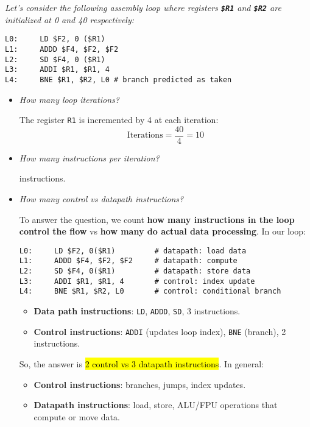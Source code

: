 \emph{Let's consider the following assembly loop where registers \textbf{\texttt{\$R1}} and \textbf{\texttt{\$R2}} are initialized at 0 and 40 respectively:}
\begin{lstlisting}[mathescape=false]
L0:     LD $F2, 0 ($R1)
L1:     ADDD $F4, $F2, $F2
L2:     SD $F4, 0 ($R1)
L3:     ADDI $R1, $R1, 4
L4:     BNE $R1, $R2, L0 # branch predicted as taken
\end{lstlisting}
\begin{itemize}
    \item \emph{How many loop iterations?}

    \answer The register \texttt{R1} is incremented by 4 at each iteration:
    \begin{equation*}
        \text{Iterations} = \dfrac{40}{4} = 10
    \end{equation*}


    \item \emph{How many instructions per iteration?}

     instructions.


    \item \emph{How many control vs datapath instructions?}

    \answer To answer the question, we count \textbf{how many instructions in the loop control the flow} vs \textbf{how many do actual data processing}. In our loop:
    \begin{lstlisting}[language=unknown]
L0:     LD $F2, 0($R1)         # datapath: load data
L1:     ADDD $F4, $F2, $F2     # datapath: compute
L2:     SD $F4, 0($R1)         # datapath: store data
L3:     ADDI $R1, $R1, 4       # control: index update
L4:     BNE $R1, $R2, L0       # control: conditional branch\end{lstlisting}
    \begin{itemize}
        \item \textbf{Data path instructions}: \texttt{LD}, \texttt{ADDD}, \texttt{SD}, 3 instructions.
        \item \textbf{Control instructions}: \texttt{ADDI} (updates loop index), \texttt{BNE} (branch), 2 instructions.
    \end{itemize}
    So, the answer is \hl{2 control vs 3 datapath instructions}. In general:
    \begin{itemize}
        \item \textbf{Control instructions}: branches, jumps, index updates.
        \item \textbf{Datapath instructions}: load, store, ALU/FPU operations that compute or move data.
    \end{itemize}
\end{itemize}

